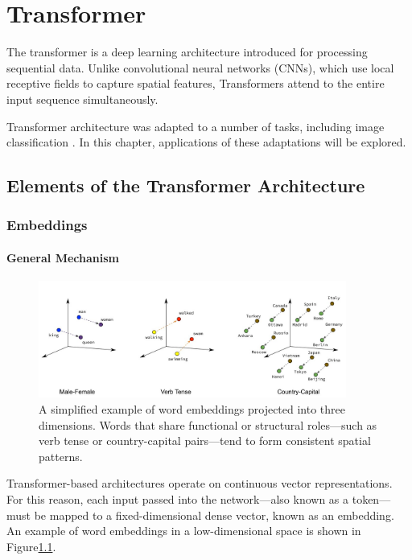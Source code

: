 \documentclass{pracalicmgr}
\begin{document}
\chapter{Transformer}

The transformer is a deep learning architecture introduced for processing sequential data\cite{Vaswani2017Attention}. Unlike convolutional neural networks (CNNs), which use local receptive fields to capture spatial features, Transformers attend to the entire input sequence simultaneously.

Transformer architecture was adapted to a number of tasks, including image classification \cite{ViT}. In this chapter, applications of these adaptations will be explored.

\section{Elements of the Transformer Architecture}

\subsection{Embeddings}

\subsubsection{General Mechanism}

\begin{figure}[h]
    \centering
    \includegraphics[width=0.9\textwidth]{src/word_embeddings_semantics.png}
    \caption{A simplified example of word embeddings projected into three dimensions. Words that share functional or structural roles—such as verb tense or country-capital pairs—tend to form consistent spatial patterns\cite{CloudxLabEmbeddings}.}
    \label{fig:embedding_example}
\end{figure}

Transformer-based architectures operate on continuous vector representations. For this reason, each input passed into the network—also known as a token—must be mapped to a fixed-dimensional dense vector, known as an embedding. An example of word embeddings in a low-dimensional space is shown in Figure\ref{fig:embedding_example}.
\end{document}
